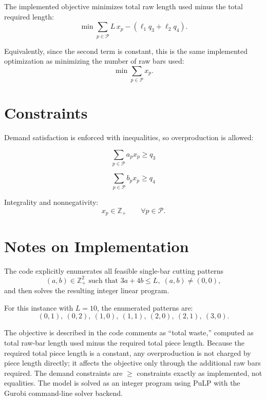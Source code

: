 The implemented objective minimizes total raw length used minus the total required length:
\[
\min \sum_{p \in \mathcal{P}} L\,x_p - (\ell_1 q_3 + \ell_2 q_4).
\]

Equivalently, since the second term is constant, this is the same implemented optimization as minimizing the number of raw bars used:
\[
\min \sum_{p \in \mathcal{P}} x_p.
\]

\section*{Constraints}

Demand satisfaction is enforced with inequalities, so overproduction is allowed:

\[
\sum_{p \in \mathcal{P}} a_p x_p \ge q_3
\]

\[
\sum_{p \in \mathcal{P}} b_p x_p \ge q_4
\]

Integrality and nonnegativity:
\[
x_p \in \mathbb{Z}_{+} \qquad \forall p \in \mathcal{P}.
\]

\section*{Notes on Implementation}

The code explicitly enumerates all feasible single-bar cutting patterns
\[
(a,b)\in \mathbb{Z}_{+}^{2} \text{ such that } 3a+4b\le L,\; (a,b)\neq(0,0),
\]
and then solves the resulting integer linear program.

For this instance with \(L=10\), the enumerated patterns are:
\[
(0,1),\ (0,2),\ (1,0),\ (1,1),\ (2,0),\ (2,1),\ (3,0).
\]

The objective is described in the code comments as ``total waste,'' computed as total raw-bar length used minus the required total piece length. Because the required total piece length is a constant, any overproduction is not charged by piece length directly; it affects the objective only through the additional raw bars required. The demand constraints are \(\ge\) constraints exactly as implemented, not equalities. The model is solved as an integer program using PuLP with the Gurobi command-line solver backend.
